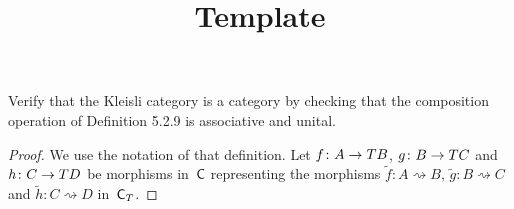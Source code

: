 \documentclass[../../solutions]{subfiles}
\title{Template}
\author{}
\begin{document}
\maketitle

%   

\begin{exercise}
  Verify that the Kleisli category is a category by checking that the
  composition operation of Definition 5.2.9 is associative and unital.
\end{exercise}

\begin{proof}
  We use the notation of that definition.  Let ${f}\colon{A}\to{TB}$,
  ${g}\colon{B}\to{TC}$ and ${h}\colon{C}\to{TD}$ be morphisms in~${\mathsf{C}}$
  representing the morphisms $\tilde f\colon A\rightsquigarrow B$,
  $\tilde g\colon B\rightsquigarrow C$ and $\tilde h\colon
  C\rightsquigarrow D$ in~${\mathsf{C}}_T$.


\end{proof}
\end{document}
